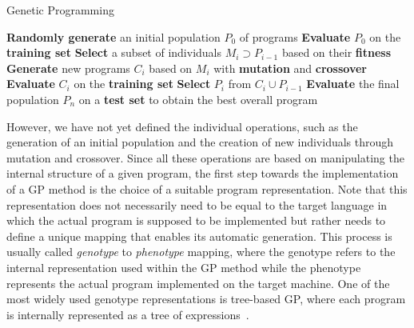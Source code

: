 \begin{algorithm}[t]
	\caption{Genetic Programming}
	\label{alg:genetic-programming}
	\begin{algorithmic}[1] %
		\State \textbf{Randomly generate} an initial population $P_0$ of programs
		\State \textbf{Evaluate} $P_0$ on the \textbf{training set} 
		\State \textbf{Select} a subset of individuals $M_i \supset P_{i-1}$ based on their \textbf{fitness}
		\State \textbf{Generate} new programs $C_i$ based on $M_i$ with \textbf{mutation} and \textbf{crossover}
		\State \textbf{Evaluate} $C_i$ on the \textbf{training set} 
		\State \textbf{Select} $P_{i}$ from $C_i \cup P_{i-1}$
		\EndFor
		\State \textbf{Evaluate} the final population $P_{n}$ on a \textbf{test set}  to obtain the best overall program
	\end{algorithmic}
\end{algorithm}
However, we have not yet defined the individual operations, such as the generation of an initial population and the creation of new individuals through mutation and crossover.
Since all these operations are based on manipulating the internal structure of a given program, the first step towards the implementation of a GP method is the choice of a suitable program representation.
Note that this representation does not necessarily need to be equal to the target language in which the actual program is supposed to be implemented but rather needs to define a unique mapping that enables its automatic generation.
This process is usually called \emph{genotype} to \emph{phenotype} mapping, where the genotype refers to the internal representation used within the GP method while the phenotype represents the actual program implemented on the target machine.
One of the most widely used genotype representations is tree-based GP, where each program is internally represented as a tree of expressions~\cite{koza1994genetic,poli2008field}.
